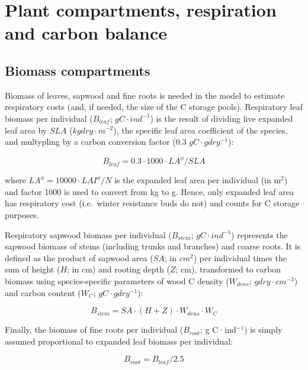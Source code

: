 \documentclass[]{book}
\begin{document}
\chapter{Plant compartments, respiration and carbon
balance}\label{plant-compartments-respiration-and-carbon-balance}

\section{Biomass compartments}\label{biomass-compartments}

Biomass of leaves, sapwood and fine roots is needed in the model to
estimate respiratory costs (and, if needed, the size of the C storage
pools). Respiratory leaf biomass per individual (\(B_{leaf}\);
\(g C·ind^{-1}\)) is the result of dividing live expanded leaf area by
\(SLA\) (\(kg dry·m^{-2}\)), the specific leaf area coefficient of the
species, and multypling by a carbon conversion factor (0.3
\(gC·g dry^{-1}\)):

\begin{equation}
B_{leaf} = 0.3 \cdot 1000 \cdot LA^{\phi} / SLA
\end{equation}

where \(LA^{\phi} = 10000 \cdot LAI^{\phi} / N\) is the expanded leaf
area per individual (in m\(^2\)) and factor 1000 is used to convert from
kg to g. Hence, only expanded leaf area has respiratory cost
(i.e.~winter resistance buds do not) and counts for C storage purposes.

Respiratory sapwood biomass per individual (\(B_{stem}\);
\(g C·ind^{-1}\)) represents the sapwood biomass of stems (including
trunks and branches) and coarse roots. It is defined as the product of
sapwood area (\(SA\); in \(cm^2\)) per individual times the sum of
height (\(H\); in cm) and rooting depth (\(Z\); cm), transformed to
carbon biomass using species-specific parameters of wood C density
(\(W_{dens}\); \(g dry·cm^{-3}\)) and carbon content (\(W_{C}\);
\(g C · g dry^{-1}\)):

\begin{equation}
B_{stem} = SA\cdot (H + Z) \cdot W_{dens} \cdot W_{C}
\end{equation}

Finally, the biomass of fine roots per individual (\(B_{root}\); g
C·ind\(^{-1}\)) is simply assumed proportional to expanded leaf biomass
per individual:

\begin{equation}
B_{root} = B_{leaf}/2.5
\end{equation}
\end{document}
